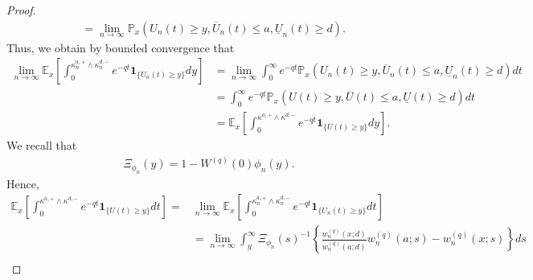 \documentclass[12pt,reqno]{amsart}
\theoremstyle{definition}
\theoremstyle{remark}
\newcommand{\ind}{\mathbf{1}}
\begin{document}
\begin{proof}
\begin{align*}
&=\lim_{n\to\infty}\mathbb{P}_x\left(U_n(t)\geq y, \overline{U}_n(t)\leq a, \underline{U}_n(t)\geq d\right).
\end{align*}
Thus, we obtain by bounded convergence that
\begin{align*}
\lim_{n\to\infty}\mathbb{E}_x\left[\int_0^{\kappa_n^{a,+}\wedge\kappa_n^{d,-}}e^{-qt}\ind_{\{U_n(t)\geq y\}}dy\right]&=
\lim_{n\to\infty}\int_0^{\infty}e^{-qt}\mathbb{P}_x\left(U_n(t)\geq y, \overline{U}_n(t)\leq a, \underline{U}_n(t)\geq d \right)dt\\
&=\int_0^{\infty}e^{-qt}\mathbb{P}_x\left(U(t)\geq y, \overline{U}(t)\leq a, \underline{U}(t)\geq d\right)dt\\
&=\mathbb{E}_x\left[\int_0^{\kappa^{a,+}\wedge\kappa^{d,-}} e^{-qt}\ind_{\{U(t)\geq y\}}dy\right].
\end{align*}
We recall that
\begin{align*}
\Xi_{\phi_{n}}(y)=1-W^{(q)}(0)\phi_{n}(y).
\end{align*}
Hence,
\begin{align*}
\mathbb{E}_x\left[\int_0^{\kappa^{a,+}\wedge\kappa^{d,-}}e^{-qt}\ind_{\{U(t)\geq y\}}dt\right]=&\lim_{n\to\infty}\mathbb{E}_x\left[\int_0^{\kappa_n^{a,+}\wedge\kappa_n^{d,-}}e^{-qt}\ind_{\{U_n(t)\geq y\}}dt\right]\\
&=\lim_{n\to\infty}\int_{y}^{\infty} \Xi_{\phi_{n}}(s)^{-1} \left\{\frac{w_n^{(q)}(x;d)}{w_n^{(q)}(a;d)}w_n^{(q)}(a;s)-w_n^{(q)}(x;s)\right\} ds\\

\end{align*}
\end{proof}
\end{document}
